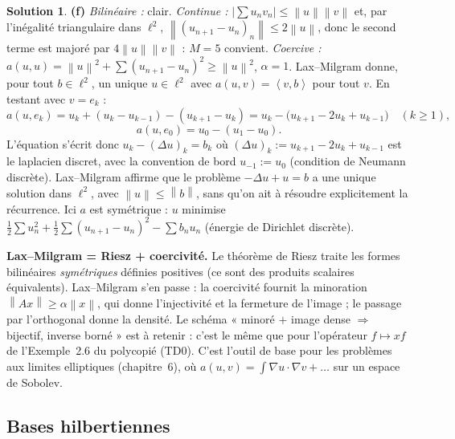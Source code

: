 \documentclass[11pt,a4paper]{article}
\newcommand{\norm}[1]{\left\|#1\right\|}
\newcommand{\ps}[2]{\left\langle #1,#2\right\rangle}
\theoremstyle{definition}
\newtheorem*{solution}{Solution}
\begin{document}
\begin{solution}
\medskip
\noindent\textbf{(f)} \emph{Bilinéaire :} clair. \emph{Continue :} $|\sum u_nv_n|\le\norm u\norm v$ et, par l'inégalité triangulaire dans $\ell^2$, $\norm{(u_{n+1}-u_n)_n}\le2\norm u$, donc le second terme est majoré par $4\norm u\norm v$ : $M=5$ convient. \emph{Coercive :} $a(u,u)=\norm u^2+\sum(u_{n+1}-u_n)^2\ge\norm u^2$, $\alpha=1$. Lax--Milgram donne, pour tout $b\in\ell^2$, un unique $u\in\ell^2$ avec $a(u,v)=\ps vb$ pour tout $v$. En testant avec $v=e_k$ :
\[
a(u,e_k)=u_k+(u_k-u_{k-1})-(u_{k+1}-u_k)=u_k-\big(u_{k+1}-2u_k+u_{k-1}\big)\quad(k\ge1),
\]
\[
a(u,e_0)=u_0-(u_1-u_0).
\]
L'équation s'écrit donc $u_k-(\Delta u)_k=b_k$ où $(\Delta u)_k:=u_{k+1}-2u_k+u_{k-1}$ est le laplacien discret, avec la convention de bord $u_{-1}:=u_0$ (condition de Neumann discrète). Lax--Milgram affirme que le problème $-\Delta u+u=b$ a une unique solution dans $\ell^2$, avec $\norm u\le\norm b$, sans qu'on ait à résoudre explicitement la récurrence. Ici $a$ est symétrique : $u$ minimise $\frac12\sum u_n^2+\frac12\sum(u_{n+1}-u_n)^2-\sum b_nu_n$ (énergie de Dirichlet discrète).
\end{solution}

\begin{pointcle}
\textbf{Lax--Milgram = Riesz + coercivité.} Le théorème de Riesz traite les formes bilinéaires \emph{symétriques} définies positives (ce sont des produits scalaires équivalents). Lax--Milgram s'en passe : la coercivité fournit la minoration $\norm{Ax}\ge\alpha\norm x$, qui donne l'injectivité et la fermeture de l'image ; le passage par l'orthogonal donne la densité. Le schéma « minoré $+$ image dense $\Rightarrow$ bijectif, inverse borné » est à retenir : c'est le même que pour l'opérateur $f\mapsto xf$ de l'Exemple~2.6 du polycopié (TD0). C'est l'outil de base pour les problèmes aux limites elliptiques (chapitre~6), où $a(u,v)=\int\nabla u\cdot\nabla v+\dots$ sur un espace de Sobolev.
\end{pointcle}

\newpage
\subsection*{Bases hilbertiennes}
\end{document}
